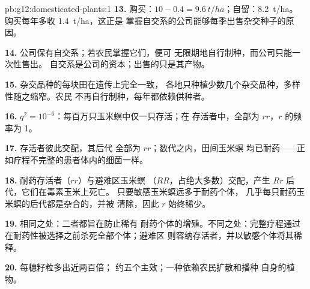 \begin{solution}{pb:g12:domesticated-plants:1}
\textbf{13.} 购买：$10 - 0.4 = \qty{9.6}{t/ha}$；自留：\qty{8.2}{t/ha}。
购买每年多收 \qty{1.4}{t/ha}，这正是
掌握自交系的公司能够每季出售杂交种子的原因。

\textbf{14.} 公司保有自交系；若农民掌握它们，便可
无限期地自行制种，而公司只能一次性售出。
自交系是公司的资本；出售的只是其产物。

\textbf{15.} 杂交品种的每块田在遗传上完全一致，
各地只种植少数几个杂交品种，多样性随之缩窄。农民
不再自行制种，每年都依赖供种者。

\textbf{16.} $q^2 = 10^{-6}$：每百万只玉米螟中仅一只存活；在
存活者中，全部为 $rr$，$r$ 的频率为 1。

\textbf{17.} 存活者彼此交配，其后代
全部为 $rr$；数代之内，田间玉米螟
均已耐药——正如疗程不完整的患者体内的细菌一样。

\textbf{18.} 耐药存活者（$rr$）与避难区玉米螟
（$RR$，占绝大多数）交配，产生 $Rr$ 后代，它们在毒素玉米上死亡。
只要敏感玉米螟远多于耐药个体，
几乎每只耐药玉米螟的后代都是杂合的，并被
清除，因此 $r$ 始终稀少。

\textbf{19.} 相同之处：二者都旨在防止稀有
耐药个体的增殖。不同之处：完整疗程通过
在耐药性被选择之前杀死全部个体；避难区
则容纳存活者，并以敏感个体将其稀释。

\textbf{20.} 每穗籽粒多出近两百倍；
约五个主效；一种依赖农民扩散和播种
自身的植物。
\end{solution}
